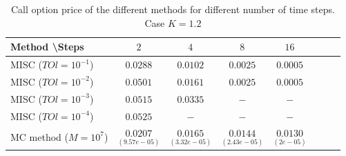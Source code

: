 \documentclass[11pt]{article}
\begin{document}
\begin{table}[h!]
	\centering
	\begin{tabular}{l*{6}{c}r}
		Method \textbackslash  Steps            & $2$ & $4$ & $8$ & $16$  \\
		\hline
		MISC ($TOl=10^{-1}$)  & $0.0288$  & $0.0102$   & $0.0025$   &  $0.0005 $ \\
		MISC ($TOl=10^{-2}$)  & $0.0501$  & $0.0161$ &   $0.0025$  &   $0.0005$  \\
		MISC ($TOl=10^{-3}$)        &  $0.0515$ & $0.0335$  &  $-$  &   $-$ \\
		MISC ($TOl=10^{-4}$)    & $0.0525$   &  $-$   & $-$ & $-$  \\
		MC method ($M=10^{7}$)   & $\underset{(9.57e-05)}{0.0207} $   & $\underset{(3.32e-05)}{0.0165} $  & $\underset{(2.43e-05)}{0.0144}$ & $\underset{(2e-05)}{0.0130} $  \\		
		\hline
	\end{tabular}
	\caption{ Call option price of the different methods for different number of time steps. Case $K=1.2$}
	\label{table: Call option price of the different methods for different number of time steps. Case $K=1.2$_H_007}
\end{table}
\end{document}
